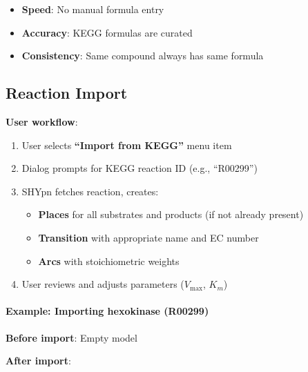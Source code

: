 \begin{itemize}
    \item \textbf{Speed}: No manual formula entry
    \item \textbf{Accuracy}: KEGG formulas are curated
    \item \textbf{Consistency}: Same compound always has same formula
\end{itemize}

\subsection{Reaction Import}
\label{subsec:reaction-import}

\textbf{User workflow}:

\begin{enumerate}
    \item User selects \textbf{``Import from KEGG''} menu item
    \item Dialog prompts for KEGG reaction ID (e.g., ``R00299'')
    \item SHYpn fetches reaction, creates:
    \begin{itemize}
        \item \textbf{Places} for all substrates and products (if not already present)
        \item \textbf{Transition} with appropriate name and EC number
        \item \textbf{Arcs} with stoichiometric weights
    \end{itemize}
    \item User reviews and adjusts parameters ($V_{\max}$, $K_m$)
\end{enumerate}

\paragraph{Example: Importing hexokinase (R00299)}

\textbf{Before import}: Empty model

\textbf{After import}:


